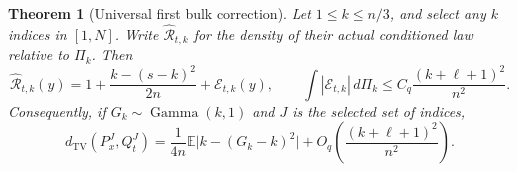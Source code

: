 \documentclass[11pt,letterpaper]{article}
\numberwithin{equation}{section}
\newtheorem{theorem}{Theorem}[section]
\theoremstyle{definition}
\theoremstyle{remark}
\newcommand{\EE}{\mathbb E}
\newcommand{\TV}{d_{\mathrm{TV}}}
\begin{document}
\begin{theorem}[Universal first bulk correction]
\label{thm:correction}
Let $1\le k\le n/3$, and select any $k$ indices in $[1,N]$. Write
$\widehat{\mathcal R}_{t,k}$ for the density of their actual conditioned law
relative to $\Pi_k$. Then
\begin{equation}
 \widehat{\mathcal R}_{t,k}(y)
 =1+\frac{k-(s-k)^2}{2n}+\mathcal E_{t,k}(y),
 \qquad
 \int|\mathcal E_{t,k}|\,d\Pi_k
 \le C_q\frac{(k+\ell+1)^2}{n^2}.
 \label{eq:firstdensity}
\end{equation}
Consequently, if $G_k\sim\operatorname{Gamma}(k,1)$ and $J$ is the selected
set of indices,
\begin{equation}
 \TV(P_x^J,Q_t^J)
 =\frac{1}{4n}\EE\big|k-(G_k-k)^2\big|
   +O_q\left(\frac{(k+\ell+1)^2}{n^2}\right).
 \label{eq:firstTV}
\end{equation}
\end{theorem}
\end{document}
